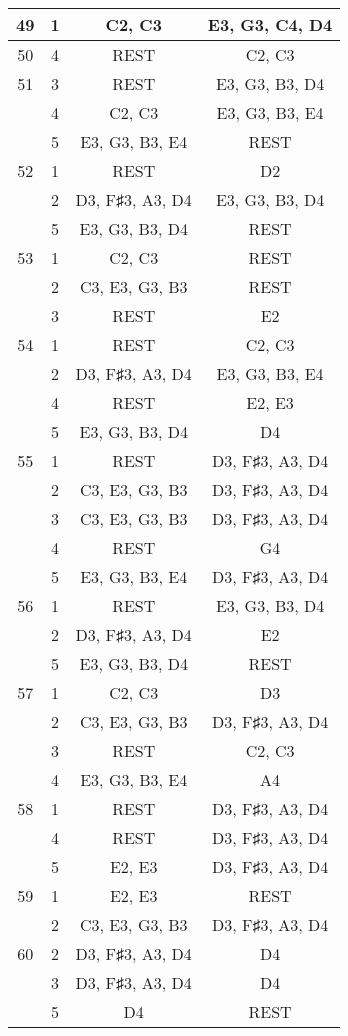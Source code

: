 \documentclass{article}
\begin{document}
\begin{longtable}{|c|c|c|c|}
\hline
49 & 1 & C2, C3 & E3, G3, C4, D4 \\ 
\hline
50 & 4 & REST & C2, C3 \\ 
\hline
51 & 3 & REST & E3, G3, B3, D4 \\ 
  & 4 & C2, C3 & E3, G3, B3, E4 \\ 
  & 5 & E3, G3, B3, E4 & REST \\ 
\hline
52 & 1 & REST & D2 \\ 
  & 2 & D3, F♯3, A3, D4 & E3, G3, B3, D4 \\ 
  & 5 & E3, G3, B3, D4 & REST \\ 
\hline
53 & 1 & C2, C3 & REST \\ 
  & 2 & C3, E3, G3, B3 & REST \\ 
  & 3 & REST & E2 \\ 
\hline
54 & 1 & REST & C2, C3 \\ 
  & 2 & D3, F♯3, A3, D4 & E3, G3, B3, E4 \\ 
  & 4 & REST & E2, E3 \\ 
  & 5 & E3, G3, B3, D4 & D4 \\ 
\hline
55 & 1 & REST & D3, F♯3, A3, D4 \\ 
  & 2 & C3, E3, G3, B3 & D3, F♯3, A3, D4 \\ 
  & 3 & C3, E3, G3, B3 & D3, F♯3, A3, D4 \\ 
  & 4 & REST & G4 \\ 
  & 5 & E3, G3, B3, E4 & D3, F♯3, A3, D4 \\ 
\hline
56 & 1 & REST & E3, G3, B3, D4 \\ 
  & 2 & D3, F♯3, A3, D4 & E2 \\ 
  & 5 & E3, G3, B3, D4 & REST \\ 
\hline
57 & 1 & C2, C3 & D3 \\ 
  & 2 & C3, E3, G3, B3 & D3, F♯3, A3, D4 \\ 
  & 3 & REST & C2, C3 \\ 
  & 4 & E3, G3, B3, E4 & A4 \\ 
\hline
58 & 1 & REST & D3, F♯3, A3, D4 \\ 
  & 4 & REST & D3, F♯3, A3, D4 \\ 
  & 5 & E2, E3 & D3, F♯3, A3, D4 \\ 
\hline
59 & 1 & E2, E3 & REST \\ 
  & 2 & C3, E3, G3, B3 & D3, F♯3, A3, D4 \\ 
\hline
60 & 2 & D3, F♯3, A3, D4 & D4 \\ 
  & 3 & D3, F♯3, A3, D4 & D4 \\ 
  & 5 & D4 & REST \\ 

\end{longtable}
\end{document}
